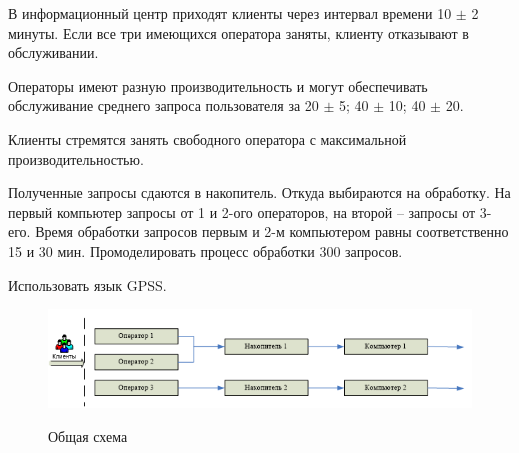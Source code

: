 В информационный центр приходят клиенты через интервал времени 10 $\pm$ 2 минуты. Если все три имеющихся оператора заняты, клиенту отказывают в обслуживании. 

Операторы имеют разную производительность и могут обеспечивать обслуживание среднего запроса пользователя за 20 $\pm$ 5; 40 $\pm$ 10; 40 $\pm$ 20. 

Клиенты стремятся занять свободного оператора с максимальной производительностью. 

Полученные запросы сдаются в накопитель. Откуда выбираются на обработку. На первый компьютер запросы от 1 и 2-ого операторов, на второй – запросы от 3-его. Время обработки запросов первым и 2-м компьютером равны соответственно 15 и 30 мин. Промоделировать процесс обработки 300 запросов.

Использовать язык GPSS.

\begin{figure}[h]
	\begin{center}
		{\includegraphics[scale = 0.9]{img/schema.png}}
		\caption{Общая схема}
		\label{fig1:image}
	\end{center}
\end{figure}